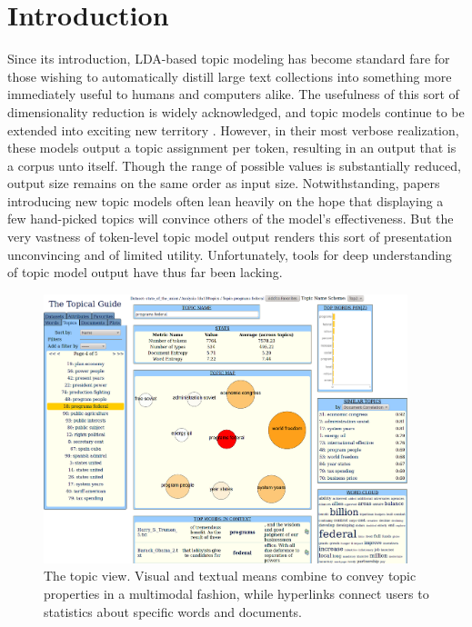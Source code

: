 \documentclass[11pt]{article}
\begin{document}
\section{Introduction}
Since its introduction, LDA-based topic modeling \cite{blei_latent_2003} has
become standard fare for those wishing to automatically distill large text%
collections into something more immediately useful to humans and computers
alike. The usefulness of this sort of dimensionality reduction is widely
acknowledged, and topic models continue to be extended into exciting new
territory
\cite{wang_continuous_2008,mimno_polylingual_2009,brody_unsupervised_2010}.
However, in their most verbose realization, these models output a topic%
assignment per token, resulting in an output that is a corpus unto itself.
Though the range of possible values is substantially reduced, output size
remains on the same order as input size. Notwithstanding, papers introducing new
topic models often lean heavily on the hope that displaying a few hand-picked
topics will convince others of the model's effectiveness. But the very vastness
of token-level topic model output renders this sort of presentation unconvincing
and of limited utility. Unfortunately, tools for deep understanding of topic model output have thus far
been lacking.
\begin{figure}[t]
 \centering
 \includegraphics[width=400px,keepaspectratio=true]{./topic_page_take5_2.png}
 \caption{The topic view. Visual and textual means combine to convey topic properties in a multimodal fashion,
while hyperlinks connect users to statistics about specific words and documents.}
 \label{fig:topic_page}
\end{figure}
\end{document}
